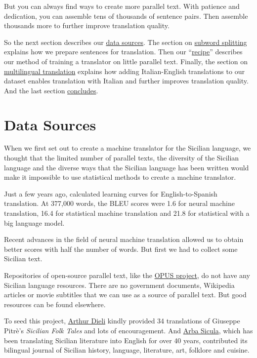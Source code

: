 \documentclass[10pt,letterpaper]{article}
\begin{document}
But you can always find ways to create more parallel text.
With patience and dedication, you can assemble tens of thousands of sentence pairs.
Then assemble thousands more to further improve translation quality.

So the next section describes our \hyperlink{data}{data sources}.  The section on
\hyperlink{subword}{subword splitting} explains how we prepare sentences for translation.
Then our ``\hyperlink{recipe}{recipe}'' describes our method of training a translator on little parallel text.
Finally, the section on \hyperlink{multilingual}{multilingual translation} explains how adding Italian-English
translations to our dataset enables translation with Italian and further improves translation quality.
And the last section \hyperlink{conclusion}{concludes}.



\hypertarget{data}{}

\section{Data Sources}

When we first set out to create a machine translator for the Sicilian language,
we thought that the limited number of parallel texts, the diversity of the Sicilian
language and the diverse ways that the Sicilian language has been written would make
it impossible to use statistical methods to create a machine translator.

Just a few years ago, \citet{koehnknowles2017} calculated learning curves for
English-to-Spanish translation.  At 377,000 words, the BLEU scores
were 1.6 for neural machine translation, 16.4 for statistical machine
translation and 21.8 for statistical with a big language model.

Recent advances in the field of neural machine translation allowed us to obtain better scores
with half the number of words.  But first we had to collect some Sicilian text.

Repositories of open-source parallel text, like the \href{http://opus.nlpl.eu/}{OPUS project},
do not have any Sicilian language resources.  There are no government documents, Wikipedia articles or
movie subtitles that we can use as a source of parallel text. But good resources can be found elsewhere.

To seed this project, \href{http://www.dieli.net/}{Arthur Dieli} kindly provided
34 translations of Giuseppe Pitrè's \textit{Sicilian Folk Tales} and lots of encouragement.
And \href{http://www.arbasicula.org/}{Arba Sicula}, 
which has been translating Sicilian literature into English for over 40 years,
contributed its bilingual journal of Sicilian history, language, literature,
art, folklore and cuisine.
\end{document}
